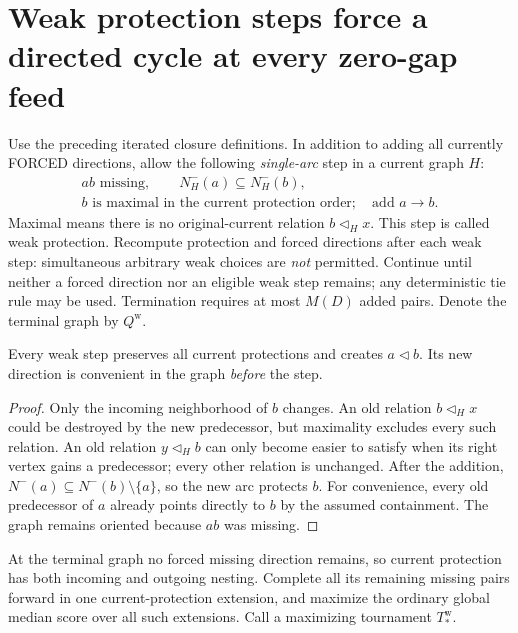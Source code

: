 \section{Weak protection steps force a directed cycle at every zero-gap feed}
\label{sec:weak-protection-closure-zero-feed-cycle}

Use the preceding iterated closure definitions. In addition to adding
all currently FORCED directions, allow the following \emph{single-arc}
step in a current graph $H$:
\[
 \begin{gathered}
 ab\text{ missing},\qquad N_H^-(a)\subseteq N_H^-(b),\\
 b\text{ is maximal in the current protection order};\quad\text{add }a\to b.
 \end{gathered}
\]
Maximal means there is no original-current relation $b\triangleleft_H x$.
This step is called weak protection. Recompute protection and forced
directions after each weak step: simultaneous arbitrary weak choices
are \emph{not} permitted. Continue until neither a forced direction nor
an eligible weak step remains; any deterministic tie rule may be used.
Termination requires at most $M(D)$ added pairs. Denote the terminal
graph by $Q^{\mathrm w}$.

\begin{lemma}
\label{lem:single-weak-protection-safe}
Every weak step preserves all current protections and creates
$a\triangleleft b$. Its new direction is convenient in the graph
\emph{before} the step.
\end{lemma}
\begin{proof}
Only the incoming neighborhood of $b$ changes. An old relation
$b\triangleleft_H x$ could be destroyed by the new predecessor, but
maximality excludes every such relation. An old relation
$y\triangleleft_H b$ can only become easier to satisfy when its right
vertex gains a predecessor; every other relation is unchanged.
After the addition,
$N^-(a)\subseteq N^-(b)\setminus\{a\}$, so the new arc protects $b$.
For convenience, every old predecessor of $a$ already points directly
to $b$ by the assumed containment. The graph remains oriented because
$ab$ was missing.
\end{proof}

At the terminal graph no forced missing direction remains, so current
protection has both incoming and outgoing nesting. Complete all its
remaining missing pairs forward in one current-protection extension,
and maximize the ordinary global median score over all such extensions.
Call a maximizing tournament $T^{\mathrm w}_*$.

